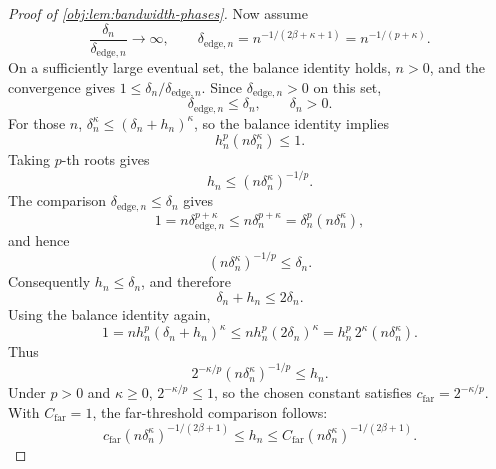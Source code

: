 \documentclass[11pt]{article}
\begin{document}
\begin{proof}[Proof of \cref{obj:lem:bandwidth-phases}]
Now assume
\[
\frac{\delta_n}{\delta_{\mathrm{edge},n}}\to\infty,
\qquad
\delta_{\mathrm{edge},n}=n^{-1/(2\beta+\kappa+1)}=n^{-1/(p+\kappa)}.
\]
On a sufficiently large eventual set, the balance identity holds, \(n>0\), and the convergence gives \(1\le\delta_n/\delta_{\mathrm{edge},n}\). Since \(\delta_{\mathrm{edge},n}>0\) on this set,
\[
\delta_{\mathrm{edge},n}\le\delta_n,
\qquad
\delta_n>0.
\]
For those \(n\), \(\delta_n^\kappa\le(\delta_n+h_n)^\kappa\), so the balance identity implies
\[
h_n^p(n\delta_n^\kappa)\le1.
\]
Taking \(p\)-th roots gives
\[
h_n\le (n\delta_n^\kappa)^{-1/p} .
\]
The comparison \(\delta_{\mathrm{edge},n}\le\delta_n\) gives
\[
1=n\delta_{\mathrm{edge},n}^{p+\kappa}
\le n\delta_n^{p+\kappa}
=\delta_n^p(n\delta_n^\kappa),
\]
and hence
\[
(n\delta_n^\kappa)^{-1/p}\le\delta_n .
\]
Consequently \(h_n\le\delta_n\), and therefore
\[
\delta_n+h_n\le2\delta_n .
\]
Using the balance identity again,
\[
1
=
n h_n^p(\delta_n+h_n)^\kappa
\le
n h_n^p(2\delta_n)^\kappa
=
h_n^p\,2^\kappa(n\delta_n^\kappa).
\]
Thus
\[
2^{-\kappa/p}(n\delta_n^\kappa)^{-1/p}\le h_n .
\]
Under \(p>0\) and \(\kappa\ge0\), \(2^{-\kappa/p}\le1\), so the chosen constant satisfies \(c_{\mathrm{far}}=2^{-\kappa/p}\). With \(C_{\mathrm{far}}=1\), the far-threshold comparison follows:
\[
c_{\mathrm{far}}(n\delta_n^\kappa)^{-1/(2\beta+1)}
\le
h_n
\le
C_{\mathrm{far}}(n\delta_n^\kappa)^{-1/(2\beta+1)} .
\]


\end{proof}
\end{document}

